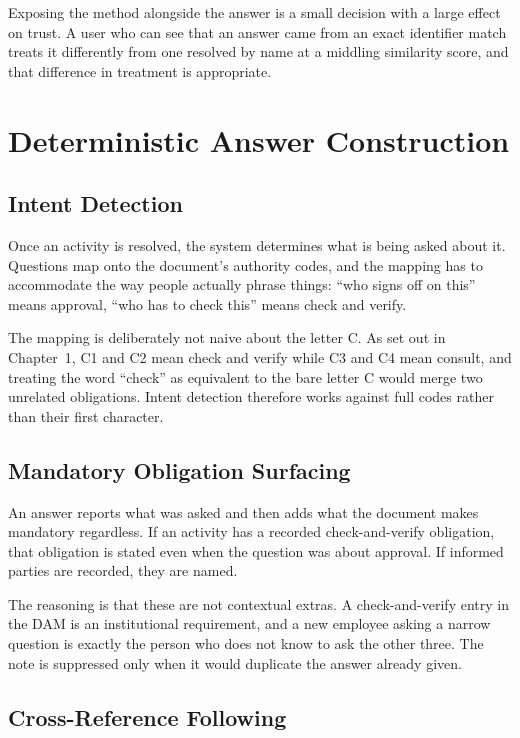 Exposing the method alongside the answer is a small decision with a large effect on trust. A user who can see that an answer came from an exact identifier match treats it differently from one resolved by name at a middling similarity score, and that difference in treatment is appropriate.

\section{Deterministic Answer Construction}

\subsection{Intent Detection}

Once an activity is resolved, the system determines what is being asked about it. Questions map onto the document's authority codes, and the mapping has to accommodate the way people actually phrase things: ``who signs off on this'' means approval, ``who has to check this'' means check and verify.

The mapping is deliberately not naive about the letter C. As set out in Chapter~1, C1 and C2 mean check and verify while C3 and C4 mean consult, and treating the word ``check'' as equivalent to the bare letter C would merge two unrelated obligations. Intent detection therefore works against full codes rather than their first character.

\subsection{Mandatory Obligation Surfacing}

An answer reports what was asked and then adds what the document makes mandatory regardless. If an activity has a recorded check-and-verify obligation, that obligation is stated even when the question was about approval. If informed parties are recorded, they are named.

The reasoning is that these are not contextual extras. A check-and-verify entry in the DAM is an institutional requirement, and a new employee asking a narrow question is exactly the person who does not know to ask the other three. The note is suppressed only when it would duplicate the answer already given.

\subsection{Cross-Reference Following}

